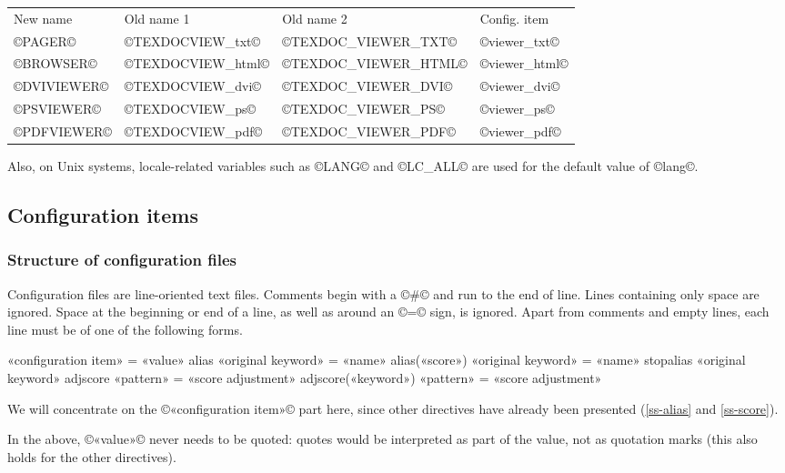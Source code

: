 \documentclass[a4paper, oneside]{scrartcl}
\makeatletter
\newenvironment{htcode}{%
  \SaveVerbatim[samepage, gobble=2]{verbmat}%
  }{%
  \endSaveVerbatim
  \par\medskip\noindent\hspace*{\parindent}%
  \BUseVerbatim{verbmat}%
  \par\medskip\@endpetrue}
\makeatother
\begin{document}
\begin{center}
  \begin{tabular}{*4l}
    New name    & Old name 1        & Old name 2           & Config. item  \\
    ©PAGER©     & ©TEXDOCVIEW_txt©  & ©TEXDOC_VIEWER_TXT©  & ©viewer_txt©  \\
    ©BROWSER©   & ©TEXDOCVIEW_html© & ©TEXDOC_VIEWER_HTML© & ©viewer_html© \\
    ©DVIVIEWER© & ©TEXDOCVIEW_dvi©  & ©TEXDOC_VIEWER_DVI©  & ©viewer_dvi©  \\
    ©PSVIEWER©  & ©TEXDOCVIEW_ps©   & ©TEXDOC_VIEWER_PS©   & ©viewer_ps©   \\
    ©PDFVIEWER© & ©TEXDOCVIEW_pdf©  & ©TEXDOC_VIEWER_PDF©  & ©viewer_pdf©  \\
  \end{tabular}
\end{center}

Also, on Unix systems, locale-related variables such as ©LANG© and ©LC_ALL©
are used for the default value of ©lang©.

\subsection{Configuration items}\label{ss-conf}

\subsubsection{Structure of configuration files}\label{sss-sonf-struct}

Configuration files are line-oriented text files. Comments begin with a ©#©
and run to the end of line. Lines containing only space are ignored. Space at
the beginning or end of a line, as well as around an ©=© sign, is ignored.
Apart from comments and empty lines, each line must be of one of the following
forms.

\begin{htcode}
  «configuration item» = «value»
  alias «original keyword» = «name»
  alias(«score») «original keyword» = «name»
  stopalias «original keyword»
  adjscore «pattern» = «score adjustment»
  adjscore(«keyword») «pattern» = «score adjustment»
\end{htcode}

We will concentrate on the ©«configuration item»© part here, since other
directives have already been presented (\ref{ss-alias} and \ref{ss-score}).

In the above, ©«value»©  never needs to be quoted: quotes would be interpreted
as part of the value, not as quotation marks (this also holds for the other
directives).
\end{document}
